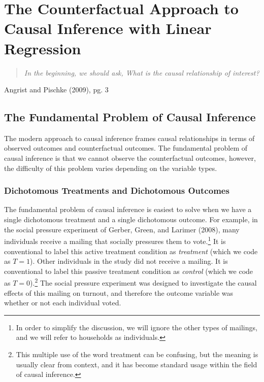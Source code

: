 \documentclass{article}
\begin{document}
\clearpage
\newpage


\section{The Counterfactual Approach to Causal Inference with Linear Regression}


\begin{quote}
{\it In the beginning, we should ask, What is the causal relationship of interest?}
\end{quote}
\begin{center}
Angrist and Pischke (2009), pg. 3
\end{center}


\subsection{The Fundamental Problem of Causal Inference}

The modern approach to causal inference frames causal relationships in terms of observed outcomes and counterfactual outcomes. The fundamental problem of causal inference is that we cannot observe the counterfactual outcomes, however, the difficulty of this problem varies depending on the variable types. 


\subsubsection{Dichotomous Treatments and Dichotomous Outcomes}

The fundamental problem of causal inference is easiest to solve when we have a single dichotomous treatment and a single dichotomous outcome. For example, in the social pressure experiment of Gerber, Green, and Larimer (2008), many individuals receive a mailing that socially pressures them to vote.\footnote{In order to simplify the discussion, we will ignore the other types of mailings, and we will refer to households as individuals.} It is conventional to label this active treatment condition as \emph{treatment} (which we code as  $T=1$). Other individuals in the study did not receive a mailing. It is conventional to label this passive treatment condition as \emph{control} (which we code as $T=0$).\footnote{This multiple use of the word treatment can be confusing, but the meaning is usually clear from context, and it has become standard usage within the field of causal inference.}  The social pressure experiment was designed to investigate the causal effects of this mailing on turnout, and therefore the outcome variable was whether or not each individual voted. 
\end{document}
